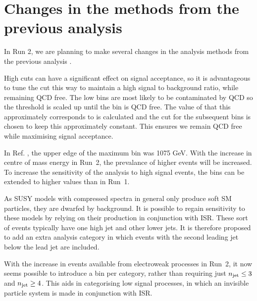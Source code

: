 \section{Changes in the methods from the previous analysis}
\label{sec:strategy}

In Run 2, we are planning to make several changes in the analysis
methods from the previous analysis \cite{CMS_AN_2013-366}.


High \alphat cuts can have a significant effect on signal acceptance, so
it is advantageous to tune the cut this way to maintain a high signal to
background ratio, while remaining QCD free. The low \HT bins are most
likely to be contaminated by QCD so the \alphat threshold is scaled up
until the bin is QCD free. The value of \mht that this approximately
corresponds to is calculated and the \alphat cut for the subsequent bins
is chosen to keep this \mht approximately constant. This ensures we
remain QCD free while maximising signal acceptance.

In Ref. \cite{CMS_AN_2013-366}, the upper edge of the maximum \HT bin
was 1075 GeV. With the increase in centre of mass energy in Run~2, the
prevalance of higher \HT events will be increased. To increase the
sensitivity of the analysis to high \HT signal events, the \HT bins can
be extended to higher values than in Run~1.

As SUSY models with compressed spectra in general only produce soft SM
particles, they are dwarfed by background. It is possible to regain
sensitivity to these models by relying on their production in
conjunction with ISR. These sort of events typically have one high \PT
jet and other lower \PT jets. It is therefore proposed to add an extra
analysis category in which events with the second leading jet below the
lead jet are included.

With the increase in events available from electroweak processes in
Run~2, it now seems possible to introduce a bin per \njet category,
rather than requiring just $n_{\text{jet}} \leq 3$ and $n_{\text{jet}} \geq 4$. This aids
in categorising low \njet signal processes, in which an invisible
particle system is made in conjunction with ISR.

